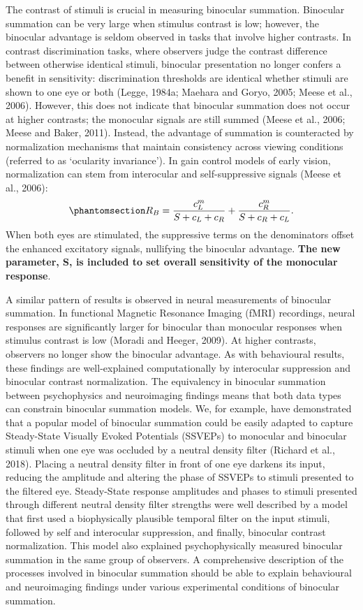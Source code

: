 \documentclass[
  12pt,
]{article}
\begin{document}
The contrast of stimuli is crucial in measuring binocular summation.
Binocular summation can be very large when stimulus contrast is low;
however, the binocular advantage is seldom observed in tasks that
involve higher contrasts. In contrast discrimination tasks, where
observers judge the contrast difference between otherwise identical
stimuli, binocular presentation no longer confers a benefit in
sensitivity: discrimination thresholds are identical whether stimuli are
shown to one eye or both (Legge, 1984a; Maehara and Goryo, 2005; Meese
et al., 2006). However, this does not indicate that binocular summation
does not occur at higher contrasts; the monocular signals are still
summed (Meese et al., 2006; Meese and Baker, 2011). Instead, the
advantage of summation is counteracted by normalization mechanisms that
maintain consistency across viewing conditions (referred to as
`ocularity invariance'). In gain control models of early vision,
normalization can stem from interocular and self-suppressive signals
(Meese et al., 2006):
\begin{equation}\phantomsection\label{eq-intoMath2}{
R_B = \frac{c_L^m}{S+c_L+c_R} + \frac{c_R^m}{S+c_R+c_L}.
}\end{equation} When both eyes are stimulated, the suppressive terms on
the denominators offset the enhanced excitatory signals, nullifying the
binocular advantage. \textbf{The new parameter, S, is included to set
overall sensitivity of the monocular response}.

A similar pattern of results is observed in neural measurements of
binocular summation. In functional Magnetic Resonance Imaging (fMRI)
recordings, neural responses are significantly larger for binocular than
monocular responses when stimulus contrast is low (Moradi and Heeger,
2009). At higher contrasts, observers no longer show the binocular
advantage. As with behavioural results, these findings are
well-explained computationally by interocular suppression and binocular
contrast normalization. The equivalency in binocular summation between
psychophysics and neuroimaging findings means that both data types can
constrain binocular summation models. We, for example, have demonstrated
that a popular model of binocular summation could be easily adapted to
capture Steady-State Visually Evoked Potentials (SSVEPs) to monocular
and binocular stimuli when one eye was occluded by a neutral density
filter (Richard et al., 2018). Placing a neutral density filter in front
of one eye darkens its input, reducing the amplitude and altering the
phase of SSVEPs to stimuli presented to the filtered eye. Steady-State
response amplitudes and phases to stimuli presented through different
neutral density filter strengths were well described by a model that
first used a biophysically plausible temporal filter on the input
stimuli, followed by self and interocular suppression, and finally,
binocular contrast normalization. This model also explained
psychophysically measured binocular summation in the same group of
observers. A comprehensive description of the processes involved in
binocular summation should be able to explain behavioural and
neuroimaging findings under various experimental conditions of binocular
summation.
\end{document}
